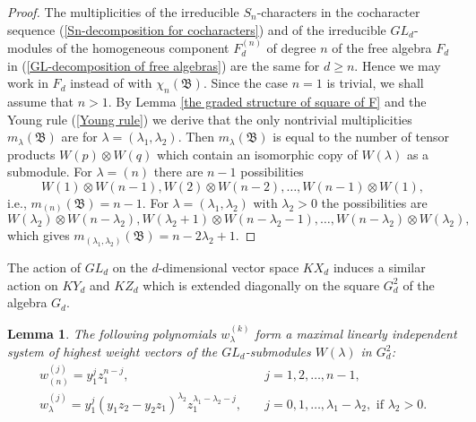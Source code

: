 \documentclass{amsart}[12pt]
\newtheorem{lemma}[theorem]{Lemma}
\theoremstyle{definition}
\begin{document}
\begin{proof}
The multiplicities of the irreducible $S_n$-characters in the cocharacter sequence (\ref{Sn-decomposition for cocharacters})
and of the irreducible $GL_d$-modules of the homogeneous component $F_d^{(n)}$ of degree $n$ of the free algebra $F_d$ in (\ref{GL-decomposition of free algebras})
are the same for $d\geq n$. Hence we may work in $F_d$ instead of with $\chi_n({\mathfrak B})$. Since the case $n=1$ is trivial, we shall assume that $n>1$.
By Lemma \ref{the graded structure of square of F} and the Young rule (\ref{Young rule}) we derive that the only nontrivial multiplicities
$m_{\lambda}({\mathfrak B})$ are for $\lambda=(\lambda_1,\lambda_2)$. Then $m_{\lambda}({\mathfrak B})$ is equal to the number of tensor products
$W(p)\otimes W(q)$ which contain an isomorphic copy of $W(\lambda)$ as a submodule. For $\lambda=(n)$ there are $n-1$ possibilities
\[
W(1)\otimes W(n-1),W(2)\otimes W(n-2),\ldots,W(n-1)\otimes W(1),
\]
i.e., $m_{(n)}({\mathfrak B})=n-1$. For $\lambda=(\lambda_1,\lambda_2)$ with $\lambda_2>0$ the possibilities are
\[
W(\lambda_2)\otimes W(n-\lambda_2),W(\lambda_2+1)\otimes W(n-\lambda_2-1),\ldots,W(n-\lambda_2)\otimes W(\lambda_2),
\]
which gives $m_{(\lambda_1,\lambda_2)}({\mathfrak B})=n-2\lambda_2+1$.
\end{proof}

The action of $GL_d$ on the $d$-dimensional vector space $KX_d$ induces a similar action on $KY_d$ and $KZ_d$ which is extended diagonally
on the square $G_d^2$ of the algebra $G_d$.

\begin{lemma}\label{hwv of G}
The following polynomials $w_{\lambda}^{(k)}$ form a maximal linearly independent system of highest weight vectors of the $GL_d$-submodules $W(\lambda)$ in $G_d^2$:
\begin{equation}\label{hwv of W(lambda)}
\begin{split}
w_{(n)}^{(j)}=y_1^jz_1^{n-j},&\quad j=1,2,\ldots,n-1,\\
w_{\lambda}^{(j)}=y_1^j(y_1z_2-y_2z_1)^{\lambda_2}z_1^{\lambda_1-\lambda_2-j}, &\quad j=0,1,\ldots,\lambda_1-\lambda_2,\text{ if }\lambda_2>0.
\end{split}
\end{equation}
\end{lemma}
\end{document}
